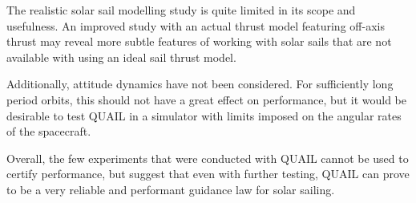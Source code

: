 The realistic solar sail modelling study is quite limited in its scope and usefulness. An improved study with an actual thrust model featuring off-axis thrust may reveal more subtle features of working with solar sails that are not available with using an ideal sail thrust model.

Additionally, attitude dynamics have not been considered. For sufficiently long period orbits, this should not have a great effect on performance, but it would be desirable to test QUAIL in a simulator with limits imposed on the angular rates of the spacecraft.

Overall, the few experiments that were conducted with QUAIL cannot be used to certify performance, but suggest that even with further testing, QUAIL can prove to be a very reliable and performant guidance law for solar sailing.